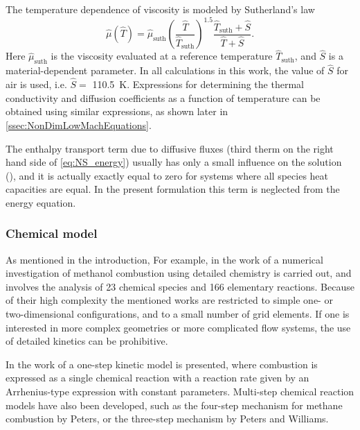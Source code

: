 The temperature dependence of viscosity is modeled by Sutherland's law \parencite{sutherlandLIIViscosityGases1893}
\begin{equation}\label{eq:DimSutherland}
	\hat{\mu}(\hat{T}) = \hat{\mu}_{\text{suth}}\left(\frac{\hat{T}}{\hat{T}_{\text{suth}}}\right)^{1.5}\frac{\hat{T}_{\text{suth}} + \hat{S}}{\hat{T}+\hat{S}}.
\end{equation}
Here $\hat{\mu}_{\text{suth}}$ is the viscosity evaluated at a reference temperature $\hat{T}_{\text{suth}}$, and $\hat S$ is a material-dependent parameter. In all calculations in this work, the value of $\hat{S}$ for air is used, i.e. $\hat{S} = $ \SI{110.5}{\kelvin}. Expressions for determining the thermal conductivity and diffusion coefficients as a function of temperature can be obtained using similar expressions, as shown later in \cref{ssec:NonDimLowMachEquations}.

The enthalpy transport term due to diffusive fluxes (third therm on the right hand side of \cref{eq:NS_energy}) usually has only a small influence on the solution (\textcite{smokeFormulationPremixedNonpremixed1991, goeyModelingSmallScale1995,paxionDevelopmentParallelUnstructured2001}), and it is actually exactly equal to zero for systems where all species heat capacities are equal. In the present formulation this term is neglected from the energy equation. 

\subsubsection{Chemical model}
As mentioned in the introduction, For example, in the work of \textcite{stauchDetailedNumericalSimulation2006} a numerical investigation of methanol combustion using detailed chemistry is carried out, and involves the analysis of 23 chemical species and 166 elementary reactions.
Because of their high complexity the mentioned works are restricted to simple one- or two-dimensional configurations, and to a small number of grid elements. If one is interested in more complex geometries or more complicated flow systems, the use of detailed kinetics can be prohibitive. 



In the work of \textcite{westbrookSimplifiedReactionMechanisms1981} a one-step kinetic model is presented, where combustion is expressed as a single chemical reaction with a reaction rate given by an Arrhenius-type expression with constant parameters. Multi-step chemical reaction models have also been developed, such as the four-step mechanism for methane combustion by Peters, \textcite{petersNumericalAsymptoticAnalysis1985} or the three-step mechanism by Peters and Williams. \textcite{petersAsymptoticStructureStoichiometric1987}


